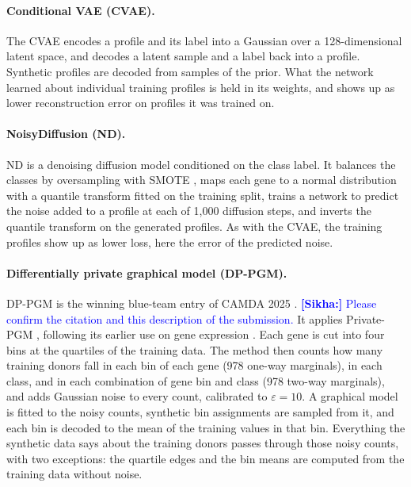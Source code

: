 \documentclass[webpdf,contemporary,large]{oup-authoring-template}
\newif\ifdraft \drafttrue
\newcommand{\annot}[3]{\ifdraft\textcolor{#1}{\textbf{[#2:]} #3}\fi}
\newcommand{\sikha}[1]{\annot{blue}{Sikha}{#1}}
\begin{document}
\paragraph{Conditional VAE (CVAE).}
The CVAE \citep{sohn2015learning} encodes a profile and its label into a Gaussian over a 128-dimensional latent space, and decodes a latent sample and a label back into a profile. Synthetic profiles are decoded from samples of the prior. What the network learned about individual training profiles is held in its weights, and shows up as lower reconstruction error on profiles it was trained on.

\paragraph{NoisyDiffusion (ND).}
ND \citep{kreuer2025noisydiffusion} is a denoising diffusion model conditioned on the class label. It balances the classes by oversampling with SMOTE \citep{chawla2002smote}, maps each gene to a normal distribution with a quantile transform fitted on the training split, trains a network to predict the noise added to a profile at each of 1{,}000 diffusion steps, and inverts the quantile transform on the generated profiles. As with the CVAE, the training profiles show up as lower loss, here the error of the predicted noise.

\paragraph{Differentially private graphical model (DP-PGM).}
DP-PGM is the winning blue-team entry of CAMDA 2025 \citep{menzies2025}. \sikha{Please confirm the citation and this description of the submission.} It applies Private-PGM \citep{mckenna2019graphical}, following its earlier use on gene expression \citep{chen2024biologically}. Each gene is cut into four bins at the quartiles of the training data. The method then counts how many training donors fall in each bin of each gene (978 one-way marginals), in each class, and in each combination of gene bin and class (978 two-way marginals), and adds Gaussian noise to every count, calibrated to $\varepsilon = 10$. A graphical model is fitted to the noisy counts, synthetic bin assignments are sampled from it, and each bin is decoded to the mean of the training values in that bin. Everything the synthetic data says about the training donors passes through those noisy counts, with two exceptions: the quartile edges and the bin means are computed from the training data without noise.
\end{document}

